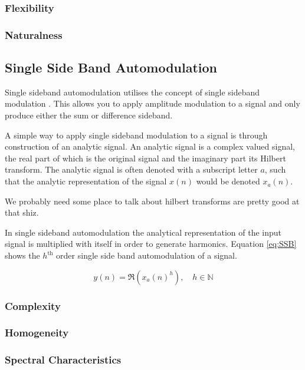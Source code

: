 		\subsubsection*{Flexibility}
		\subsubsection*{Naturalness}

	\subsection{Single Side Band Automodulation}
	\label{sec:Excitation-SSB}
		Single sideband automodulation utilises the concept of single sideband modulation
		\citep{corinthios2009signals}. This allows you to apply amplitude modulation to a signal and only produce
		either the sum or difference sideband.

		A simple way to apply single sideband modulation to a signal is through construction of an analytic signal.
		An analytic signal is a complex valued signal, the real part of which is the original signal and the
		imaginary part its Hilbert transform. The analytic signal is often denoted with a subscript letter
		$a$, such that the analytic representation of the signal $x(n)$ would be denoted $x_{a}(n)$.

		\note
		{
			We probably need some place to talk about hilbert transforms \citet{oppenheim2014discrete} are
			pretty good at that shiz.
		}

		In single sideband automodulation the analytical representation of the input signal is multiplied with
		itself in order to generate harmonics. Equation \ref{eq:SSB} shows the $h^{\text{th}}$ order single side
		band automodulation of a signal.

		\begin{equation}
			y(n) = \Re \left( x_{a}(n)^{h} \right), \quad h \in \mathbb{N}
			\label{eq:SSB}
		\end{equation}

		\subsubsection*{Complexity}
		\subsubsection*{Homogeneity}
		\subsubsection*{Spectral Characteristics}
